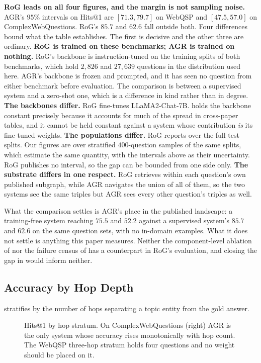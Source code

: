 \textbf{RoG leads on all four figures, and the margin is not sampling
noise.} AGR's $95\%$ intervals on Hits@1 are $[71.3, 79.7]$ on WebQSP
and $[47.5, 57.0]$ on ComplexWebQuestions. RoG's $85.7$ and $62.6$ fall
outside both. Four differences bound what the table establishes. The
first is decisive and the other three are ordinary. \textbf{RoG is
trained on these benchmarks; AGR is trained on nothing.} RoG's backbone
is instruction-tuned on the training splits of both benchmarks, which
hold $2{,}826$ and $27{,}639$ questions in the distribution used here.
AGR's backbone is frozen and prompted, and it has seen no question from
either benchmark before evaluation. The comparison is between a
supervised system and a zero-shot one, which is a difference in kind
rather than in degree. \textbf{The backbones differ.} RoG fine-tunes
LLaMA2-Chat-7B.  holds the backbone constant
precisely because it accounts for much of the spread in cross-paper
tables, and it cannot be held constant against a system whose
contribution \emph{is} its fine-tuned weights. \textbf{The populations
differ.} RoG reports over the full test splits. Our figures are over
stratified $400$-question samples of the same splits, which estimate the
same quantity, with the intervals above as their uncertainty. RoG
publishes no interval, so the gap can be bounded from one side only.
\textbf{The substrate differs in one respect.} RoG retrieves within each
question's own published subgraph, while AGR navigates the union of all
of them, so the two systems see the same triples but AGR sees every
other question's triples as well.

What the comparison settles is AGR's place in the published landscape: a
training-free system reaching $75.5$ and $52.2$ against a supervised
system's $85.7$ and $62.6$ on the same question sets, with no in-domain
examples. What it does not settle is anything this paper measures.
Neither the component-level ablation of  nor the
failure census of  has a counterpart in RoG's
evaluation, and closing the gap in  would inform neither.

\subsection{Accuracy by Hop Depth}\label{sec:hops}

 stratifies by the number of hops separating a topic
entity from the gold answer.

\begin{figure}[!tb]
  \begin{center}
    
  \end{center}
  \caption{Hits@1 by hop stratum. On ComplexWebQuestions (right) AGR is
    the only system whose accuracy rises monotonically with hop count.
    The WebQSP three-hop stratum holds four questions and no weight
    should be placed on it.}
  \label{fig:hopstrata}
\end{figure}

